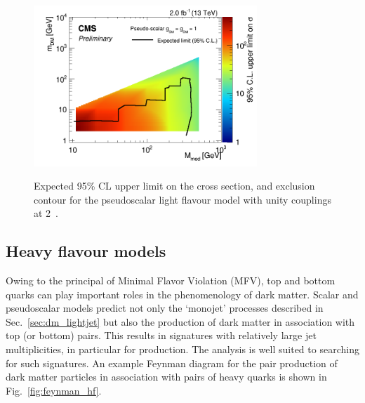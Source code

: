 \begin{figure}
\begin{center}
\includegraphics[width=0.75\textwidth]{figures/DMplots/dm_P_g1p0_2p0fb_2dlimits.png} \\
\caption{Expected 95\% CL upper limit on the cross section, and exclusion
contour for the pseudoscalar light flavour model with unity couplings at 2~\ifb.}
\label{fig:dm_P_g1_2fb_2dlimits}
\end{center}
\end{figure}




\clearpage



\clearpage \subsection{Heavy flavour models} \label{sec:dm_heavyjet}

Owing to the principal of Minimal Flavor Violation (MFV), top and bottom quarks
can play important roles in the phenomenology of dark matter. Scalar and
pseudoscalar models predict not only the `monojet' processes described in
Sec.~\ref{sec:dm_lightjet} but also the production of dark matter in association
with top (or bottom) pairs. This results in signatures with relatively large jet
multiplicities, in particular for \DMtt production. The \alphat analysis is well 
suited to searching for such signatures. An example Feynman diagram for the pair
production of dark matter particles in association with pairs of heavy quarks is
shown in Fig.~\ref{fig:feynman_hf}.


